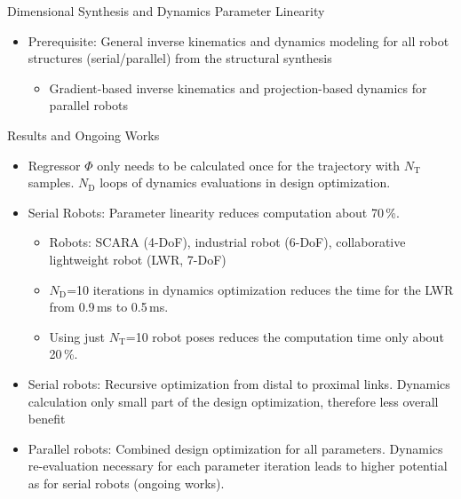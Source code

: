 \documentclass[c]{beamer}
\begin{document}
\begin{frame}
\begin{whiteblock}{Dimensional Synthesis and Dynamics Parameter Linearity}
{\begin{multicols}{2}
\begin{itemize}
    \item Prerequisite: General inverse kinematics and dynamics modeling for all robot structures (serial/parallel) from the structural synthesis
    \begin{itemize}
        \item Gradient-based inverse kinematics and projection-based dynamics for parallel robots
    \end{itemize}
\end{itemize}
\begin{figure}[t]
    \centering
    
\end{figure}

\end{multicols}}
\end{whiteblock}
\begin{block}{Results and Ongoing Works}
\parbox{\columnwidth}{
\begin{multicols}{2}
[]
\begin{itemize}
    \item Regressor $\bm{\varPhi}$ only needs to be calculated once for the trajectory with $N_\mathrm{T}$ samples. $N_\mathrm{D}$ loops of dynamics evaluations in design optimization.
    \item Serial Robots: Parameter linearity reduces computation about 70\,\%.
    \begin{itemize}
        \item Robots: SCARA (4-DoF), industrial robot (6-DoF), collaborative lightweight robot (LWR, 7-DoF)
        \item $N_\mathrm{D}$=10 iterations in dynamics optimization reduces the time for the LWR from 0.9\,ms to 0.5\,ms.
        \item Using just $N_\mathrm{T}$=10 robot poses reduces the computation time only about 20\,\%.
    \end{itemize}
    \item Serial robots: Recursive optimization from distal to proximal links. Dynamics calculation only small part of the design optimization, therefore less overall benefit 
    \item Parallel robots: Combined design optimization for all parameters. Dynamics re-evaluation necessary for each parameter iteration leads to higher potential as for serial robots (ongoing works).
\end{itemize}

\begin{figure}[t]
    \centering
    
\end{figure}

\end{multicols}}
\end{block}
\end{frame}
\end{document}
